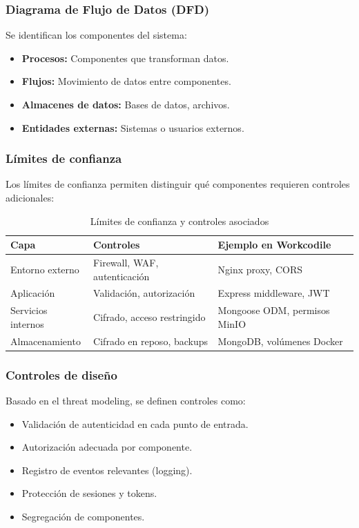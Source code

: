\subsubsection{Diagrama de Flujo de Datos (DFD)}

Se identifican los componentes del sistema:

\begin{itemize}
    \item \textbf{Procesos:} Componentes que transforman datos.
    \item \textbf{Flujos:} Movimiento de datos entre componentes.
    \item \textbf{Almacenes de datos:} Bases de datos, archivos.
    \item \textbf{Entidades externas:} Sistemas o usuarios externos.
\end{itemize}

\subsubsection{Límites de confianza}

Los límites de confianza permiten distinguir qué componentes requieren controles adicionales:

\begin{table}[h]
\centering
\small
\begin{tabular}{|l|l|l|}
\hline
\textbf{Capa} & \textbf{Controles} & \textbf{Ejemplo en Workcodile} \\
\hline
Entorno externo & Firewall, WAF, autenticación & Nginx proxy, CORS \\
Aplicación & Validación, autorización & Express middleware, JWT \\
Servicios internos & Cifrado, acceso restringido & Mongoose ODM, permisos MinIO \\
Almacenamiento & Cifrado en reposo, backups & MongoDB, volúmenes Docker \\
\hline
\end{tabular}
\caption{Límites de confianza y controles asociados}
\label{tab:limites-confianza}
\end{table}

\subsubsection{Controles de diseño}

Basado en el threat modeling, se definen controles como:

\begin{itemize}
    \item Validación de autenticidad en cada punto de entrada.
    \item Autorización adecuada por componente.
    \item Registro de eventos relevantes (logging).
    \item Protección de sesiones y tokens.
    \item Segregación de componentes.
\end{itemize}

